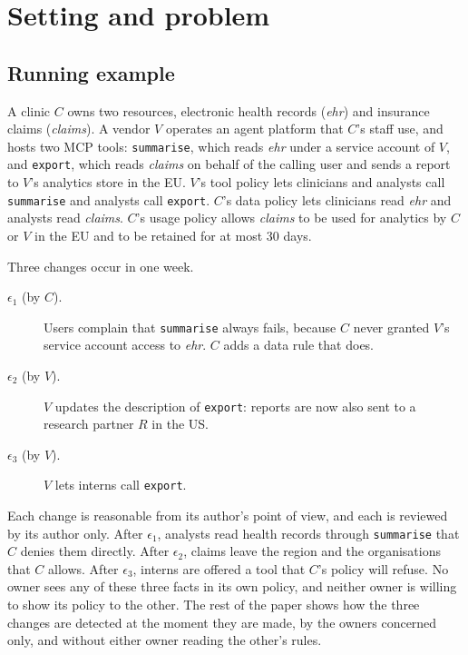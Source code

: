 \section{Setting and problem}\label{sec:setting}

\subsection{Running example}\label{sec:example}
A clinic $C$ owns two resources, electronic health records (\textit{ehr}) and insurance claims (\textit{claims}). A vendor $V$ operates an agent platform that $C$'s staff use, and hosts two MCP tools: \texttt{summarise}, which reads \textit{ehr} under a service account of $V$, and \texttt{export}, which reads \textit{claims} on behalf of the calling user and sends a report to $V$'s analytics store in the EU. $V$'s tool policy lets clinicians and analysts call \texttt{summarise} and analysts call \texttt{export}. $C$'s data policy lets clinicians read \textit{ehr} and analysts read \textit{claims}. $C$'s usage policy allows \textit{claims} to be used for analytics by $C$ or $V$ in the EU and to be retained for at most 30 days.

Three changes occur in one week.
\begin{description}
\item[$\epsilon_1$ (by $C$).] Users complain that \texttt{summarise} always fails, because $C$ never granted $V$'s service account access to \textit{ehr}. $C$ adds a data rule that does.
\item[$\epsilon_2$ (by $V$).] $V$ updates the description of \texttt{export}: reports are now also sent to a research partner $R$ in the US.
\item[$\epsilon_3$ (by $V$).] $V$ lets interns call \texttt{export}.
\end{description}
Each change is reasonable from its author's point of view, and each is reviewed by its author only. After $\epsilon_1$, analysts read health records through \texttt{summarise} that $C$ denies them directly. After $\epsilon_2$, claims leave the region and the organisations that $C$ allows. After $\epsilon_3$, interns are offered a tool that $C$'s policy will refuse. No owner sees any of these three facts in its own policy, and neither owner is willing to show its policy to the other. The rest of the paper shows how the three changes are detected at the moment they are made, by the owners concerned only, and without either owner reading the other's rules.

